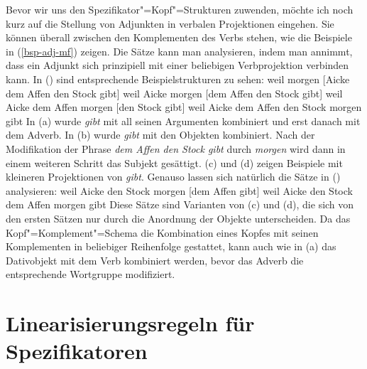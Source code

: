 \noindent
Bevor wir uns den Spezifikator"=Kopf"=Strukturen zuwenden, möchte ich noch kurz
auf die Stellung von Adjunkten in verbalen Projektionen eingehen. Sie können überall zwischen den
Komplementen des Verbs stehen, wie die Beispiele in (\ref{bsp-adj-mf}) zeigen. Die Sätze kann man analysieren,
indem man annimmt, dass ein Adjunkt sich prinzipiell mit einer beliebigen Verbprojektion
verbinden kann. In () sind entsprechende Beispielstrukturen zu sehen:
\eal
\label{bsp-adj-mf-zwei}
\ex weil morgen [Aicke dem Affen den Stock gibt]
\ex weil Aicke morgen [dem Affen den Stock gibt]
\ex weil Aicke dem Affen morgen [den Stock gibt]
\ex weil Aicke dem Affen den Stock morgen gibt
\zl
In (a) wurde \emph{gibt} mit all seinen Argumenten kombiniert und erst danach
mit dem Adverb. In (b) wurde \emph{gibt} mit den Objekten kombiniert. Nach der
Modifikation der Phrase \emph{dem Affen den Stock gibt} durch \emph{morgen} wird dann
in einem weiteren Schritt das Subjekt gesättigt. (c) und (d) zeigen Beispiele mit kleineren
Projektionen von \emph{gibt}. Genauso lassen sich natürlich die Sätze in ()
analysieren:
\eal
\ex weil Aicke den Stock morgen [dem Affen gibt]
\ex weil Aicke den Stock dem Affen morgen gibt
\zl
Diese Sätze sind Varianten von (c) und (d), die sich von den ersten Sätzen
nur durch die Anordnung der Objekte unterscheiden. Da das Kopf"=Komplement"=Schema die Kombination
eines Kopfes mit seinen Komplementen in beliebiger Reihenfolge gestattet, kann auch wie in (a)
das Dativobjekt mit dem Verb kombiniert werden, bevor das Adverb die entsprechende Wortgruppe
modifiziert.%


\section{Linearisierungsregeln für Spezifikatoren}
\label{sec-spr}

